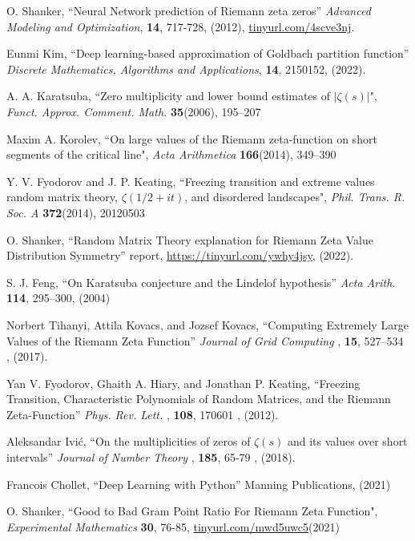 \documentclass[twoside]{article}
\begin{document}

\begin{thebibliography}{10}

 O. Shanker, ``Neural Network prediction of Riemann zeta zeros''
{\it Advanced Modeling and Optimization}, {\bf 14}, 717-728, (2012), \url{tinyurl.com/4scve3nj}.

 Eunmi Kim, ``Deep learning-based approximation of Goldbach partition function''
{\it  Discrete Mathematics, Algorithms and Applications}, {\bf 14}, 2150152, (2022). 

 A. A. Karatsuba, 
``Zero multiplicity and lower bound estimates of $|\zeta(s)|$",
{\it Funct.  Approx. Comment. Math.} {\bf35}(2006), 195–207

 Maxim A. Korolev, 
``On large values of the Riemann zeta-function on short segments of the critical line",
{\it Acta Arithmetica} {\bf166}(2014), 349–390

 Y. V. Fyodorov and J. P. Keating,
``Freezing transition and extreme values random matrix theory, $\zeta(1/2 + it)$, and disordered landscapes",
{\it Phil. Trans. R. Soc. A} {\bf372}(2014),  20120503

 O. Shanker, 
``Random Matrix Theory explanation for Riemann Zeta Value Distribution Symmetry''
 report,
\url{https://tinyurl.com/ywhy4jsy}, 
(2022). 

 S. J. Feng, ``On Karatsuba conjecture and the Lindelof hypothesis'' 
{\it  Acta Arith.} {\bf 114}, 295–300,  (2004)

 Norbert Tihanyi, Attila Kovacs,  and Jozsef Kovacs, 
``Computing Extremely Large Values of the Riemann Zeta Function''
{\it  Journal of Grid Computing }, {\bf 15}, 527–534 , (2017). 

Yan V. Fyodorov, Ghaith A. Hiary, and Jonathan P. Keating, 
``Freezing Transition, Characteristic Polynomials of Random Matrices, and the Riemann Zeta-Function''
{\it  Phys. Rev. Lett. }, {\bf 108}, 170601 , (2012). 

 Aleksandar Ivić, 
``On the multiplicities of zeros of $\zeta(s)$ and its values over short intervals''
{\it  Journal of Number Theory }, {\bf 185}, 65-79 , (2018). 

 Francois Chollet, ``Deep Learning with Python''
Manning Publications,  (2021)

 O. Shanker, 
``Good to Bad Gram Point Ratio For Riemann Zeta Function",
{\it Experimental Mathematics} {\bf 30}, 76-85,
\url{tinyurl.com/mwd5uwc5}(2021)


\end{thebibliography}
\end{document}
